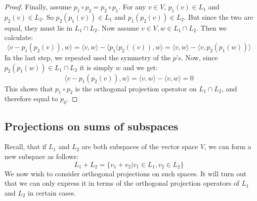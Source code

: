 \documentclass[12pt, a4paper]{article}
\numberwithin{equation}{section}
\begin{document}
\begin{proof}
Finally, assume $p_1\circ p_2=p_2\circ p_1$. For any $v\in V$, $p_1(v)\in L_1$ and $p_2(v)\in L_2$. So $p_2(p_1(v))\in L_1$ and $p_1(p_2(v))\in L_2$. But since the two are equal, they must lie in $L_1\cap L_2$. Now assume $v\in V, w\in L_1\cap L_2$. Then we calculate:
\begin{equation}
\langle v-p_1(p_2(v)),w\rangle=\langle v,w\rangle-\langle p_1(p_2((v)),w\rangle=\langle v,w\rangle-\langle v,p_2(p_1(w))\rangle
\end{equation}
In the last step, we repeated used the symmetry of the $p$'s. Now, since $p_2(p_1(w))\in L_1\cap L_2$ it is simply $w$ and we get:
\begin{equation}
\langle v-p_1(p_2(v)),w\rangle=\langle v,w\rangle-\langle v,w\rangle=0
\end{equation}
This shows that $p_1\circ p_2$ is the orthogonal projection operator on $L_1\cap L_2$, and therefore equal to $p_0$.
\end{proof}

\subsection{Projections on sums of subspaces}
Recall, that if $L_1$ and $L_2$ are both subspaces of the vector space $V$, we can form a new subspace as follows:
\begin{equation}
L_1+L_2=\{v_1+v_2|v_1\in L_1, v_2\in L_2\}
\end{equation}
We now wish to consider orthogonal projections on such spaces. It will turn out that we can only express it in terms of the orthogonal projection operators of $L_1$ and $L_2$ in certain cases.
\end{document}
